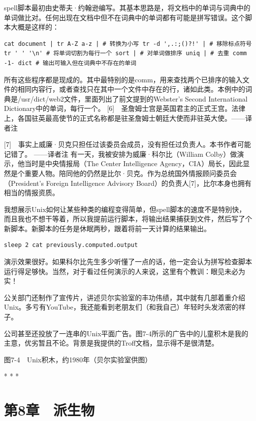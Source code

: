 \documentclass[a4paper,12pt,UTF8,twoside]{ctexbook}
\begin{document}
spell脚本最初由史蒂夫·约翰逊编写。其基本思路是，将文档中的单词与词典中的单词做比对。任何出现在文档中但不在词典中的单词都有可能是拼写错误。这个脚本大概是这样的：
\begin{lstlisting}
cat document | tr A-Z a-z | # 转换为小写 tr -d ',.:;()?!' | # 移除标点符号 tr ' ' '\n' # 将单词切割为每行一个 sort | # 对单词做排序 uniq | # 去重 comm -1- dict # 输出可输入但在词典中不存在的单词
\end{lstlisting}
所有这些程序都是现成的。其中最特别的是comm，用来查找两个已排序的输入文件的相同内容行，或者查找只在其中一个文件中存在的行，诸如此类。本例中的词典是/usr/dict/web2文件，里面列出了前文提到的Webster’s Second International Dictionary中的单词，每行一个。
[6]　圣詹姆士宫是英国君主的正式王宫。法律上，各国驻英最高使节的正式名称都是驻圣詹姆士朝廷大使而非驻英大使。——译者注

[7]　事实上威廉·贝克只担任过该委员会成员，没有担任过负责人。本书作者可能记错了。 ——译者注
有一天，我被安排为威廉·科尔比（William Colby）做演示，他当时是中央情报局（The Center Intelligence Agency，CIA）局长，因此显然是个重要人物。陪同他的仍然是比尔·贝克。作为总统国外情报顾问委员会（President’s Foreign Intelligence Advisory Board）的负责人[7]，比尔本身也拥有相当的情报资质。

我想展示Unix如何让某些种类的编程变得简单，但spell脚本的速度不是特别快，而且我也不想干等着，所以我提前运行脚本，将输出结果捕获到文件，然后写了个新脚本。新脚本的任务是休眠两秒，跟着将前一天计算的结果输出。
\begin{lstlisting}
sleep 2 cat previously.computed.output
\end{lstlisting}
演示效果很好。如果科尔比先生多少听懂了一点的话，他一定会认为拼写检查脚本运行得足够快。当然，对于看过任何演示的人来说，这里有个教训：眼见未必为实！

公关部门还制作了宣传片，讲述贝尔实验室的丰功伟绩，其中就有几部着重介绍Unix。多亏有YouTube，我还能看到老朋友们（和我自己）年轻时头发浓密的样子。

公司甚至还投放了一连串的Unix平面广告。图7-4所示的广告中的儿童积木是我的主意，优劣暂且不论。背景是我提供的Troff文档，显示得不是很清楚。



图7-4　Unix积木，约1980年（贝尔实验室供图）



* * *









\chapter{第8章　派生物}
\end{document}
